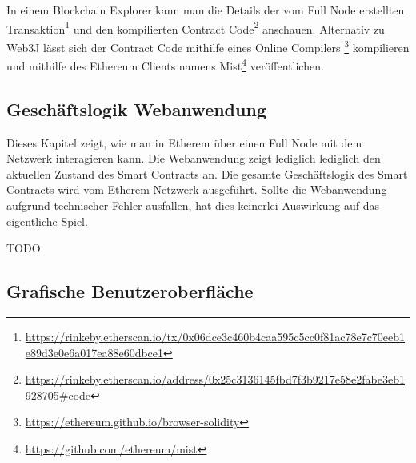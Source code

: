 In einem Blockchain Explorer kann man die Details der vom Full Node erstellten Transaktion\footnote{\url{https://rinkeby.etherscan.io/tx/0x06dce3c460b4caa595c5cc0f81ac78e7c70eeb1e89d3e0e6a017ea88e60dbce1}} und den kompilierten Contract Code\footnote{\url{https://rinkeby.etherscan.io/address/0x25c3136145fbd7f3b9217e58e2fabe3eb1928705\#code}} anschauen.
Alternativ zu Web3J lässt sich der Contract Code mithilfe eines Online Compilers \footnote{\url{https://ethereum.github.io/browser-solidity}} kompilieren und mithilfe des Ethereum Clients namens Mist\footnote{\url{https://github.com/ethereum/mist}} veröffentlichen.

\subsection{Geschäftslogik Webanwendung}

Dieses Kapitel zeigt, wie man in Etherem über einen Full Node mit dem Netzwerk interagieren kann. Die Webanwendung zeigt lediglich lediglich den aktuellen Zustand des Smart Contracts an. Die gesamte Geschäftslogik des Smart Contracts wird vom Etherem Netzwerk ausgeführt. Sollte die Webanwendung aufgrund  technischer Fehler ausfallen, hat dies keinerlei Auswirkung auf das eigentliche Spiel.

TODO 

\subsection{Grafische Benutzeroberfläche}

